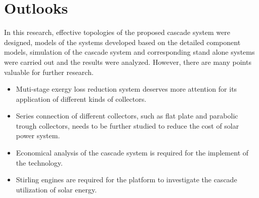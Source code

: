 \section{Outlooks}
In this research, effective topologies of the proposed cascade system were designed, models of the systems developed based on the detailed component models, simulation of the cascade system and corresponding stand alone systems were carried out and the results were analyzed. However, there are many points valuable for further research.
\begin{itemize}
  \item Muti-stage exergy loss reduction system deserves more attention for its application of different kinds of collectors.
  \item Series connection of different collectors, such as flat plate and parabolic trough collectors, needs to be further studied to reduce the cost of solar power system.
  \item Economical analysis of the cascade system is required for the implement of the technology.
  \item Stirling engines are required for the platform to investigate the cascade utilization of solar energy.
\end{itemize}